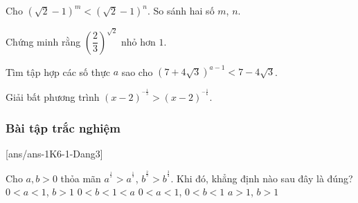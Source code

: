 \begin{bt}%
	Cho $\left(\sqrt{2}-1\right)^m < \left(\sqrt{2}-1\right)^n$. So sánh hai số $m$, $n$.
\end{bt}
\begin{bt}%
	Chứng minh rằng $\left(\dfrac{2}{3}\right)^{\sqrt 2}$ nhỏ hơn $1$.
\end{bt}
\begin{bt}%
	Tìm tập hợp các số thực $a$ sao cho $\left(7+4\sqrt{3}\right)^{a-1}<7-4\sqrt{3}$.
\end{bt}

\begin{bt}%
	Giải bất phương trình $(x-2)^{^{-\tfrac{1}{3}}}>(x-2)^{^{-\tfrac{1}{6}}}$.
\end{bt}
\subsubsection{Bài tập trắc nghiệm}
[ans/ans-1K6-1-Dang3]

\begin{ex}%
	Cho $a,b>0$ thỏa mãn $a^{^{\tfrac{1}{2}}}>a^{^{\tfrac{1}{3}}}$, $b^{^{\tfrac{2}{3}}}>b^{^{\tfrac{3}{4}}}$. Khi đó, khẳng định nào sau đây là đúng?
	\choice
	{$0<a<1$, $b>1$}
	{\True $0<b<1<a$}
	{$0<a<1$, $0<b<1$}
	{$a>1$, $b>1$}
\end{ex}

